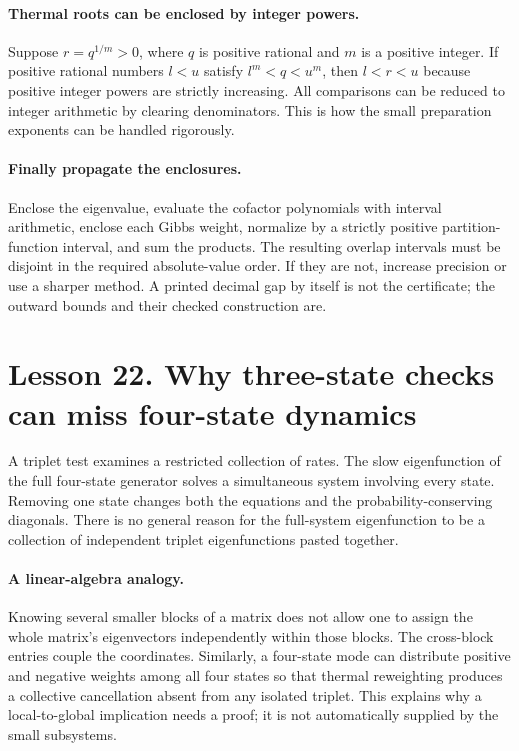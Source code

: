 \paragraph{Thermal roots can be enclosed by integer powers.}
Suppose $r=q^{1/m}>0$, where $q$ is positive rational and $m$ is a positive
integer. If positive rational numbers $l<u$ satisfy $l^m<q<u^m$, then
$l<r<u$ because positive integer powers are strictly increasing. All
comparisons can be reduced to integer arithmetic by clearing denominators.
This is how the small preparation exponents can be handled rigorously.

\paragraph{Finally propagate the enclosures.}
Enclose the eigenvalue, evaluate the cofactor polynomials with interval
arithmetic, enclose each Gibbs weight, normalize by a strictly positive
partition-function interval, and sum the products. The resulting overlap
intervals must be disjoint in the required absolute-value order. If they
are not, increase precision or use a sharper method. A printed decimal
gap by itself is not the certificate; the outward bounds and their checked
construction are.

\clearpage
\section*{Lesson 22. Why three-state checks can miss four-state dynamics}
A triplet test examines a restricted collection of rates. The slow
eigenfunction of the full four-state generator solves a simultaneous system
involving every state. Removing one state changes both the equations and
the probability-conserving diagonals. There is no general reason for the
full-system eigenfunction to be a collection of independent triplet
eigenfunctions pasted together.

\paragraph{A linear-algebra analogy.}
Knowing several smaller blocks of a matrix does not allow one to assign the
whole matrix's eigenvectors independently within those blocks. The
cross-block entries couple the coordinates. Similarly, a four-state mode
can distribute positive and negative weights among all four states so that
thermal reweighting produces a collective cancellation absent from any
isolated triplet. This explains why a local-to-global implication needs a
proof; it is not automatically supplied by the small subsystems.

